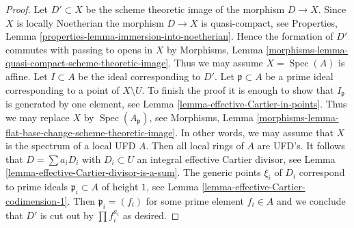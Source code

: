 \documentclass[10pt,a4paper]{amsart}
\theoremstyle{plain}
\theoremstyle{definition}
\theoremstyle{remark}
\numberwithin{equation}{subsection}
\def\Spec{\mathop{\mathrm{Spec}}}
\begin{document}
\begin{proof}
Let $D' \subset X$ be the scheme theoretic image of the morphism $D \to X$.
Since $X$ is locally Noetherian the morphism $D \to X$ is quasi-compact, see
Properties, Lemma \ref{properties-lemma-immersion-into-noetherian}.
Hence the formation of $D'$ commutes with passing to opens in $X$ by
Morphisms, Lemma \ref{morphisms-lemma-quasi-compact-scheme-theoretic-image}.
Thus we may assume $X = \Spec(A)$ is affine.
Let $I \subset A$ be the ideal corresponding to $D'$.
Let $\mathfrak p \subset A$ be a prime ideal corresponding to a point
of $X \setminus U$.
To finish the proof it is enough to show that $I_\mathfrak p$ is generated
by one element, see Lemma \ref{lemma-effective-Cartier-in-points}.
Thus we may replace $X$ by $\Spec(A_\mathfrak p)$, see
Morphisms, Lemma \ref{morphisms-lemma-flat-base-change-scheme-theoretic-image}.
In other words, we may assume that $X$ is the spectrum of a local
UFD $A$. Then all local rings of $A$ are UFD's. It follows that
$D = \sum a_i D_i$ with $D_i \subset U$ an integral effective Cartier divisor,
see Lemma \ref{lemma-effective-Cartier-divisor-is-a-sum}.
The generic points $\xi_i$ of $D_i$ correspond to prime ideals
$\mathfrak p_i \subset A$ of height $1$, see
Lemma \ref{lemma-effective-Cartier-codimension-1}.
Then $\mathfrak p_i = (f_i)$ for some prime element $f_i \in A$
and we conclude that $D'$ is cut out by $\prod f_i^{a_i}$ as desired.
\end{proof}
\end{document}
